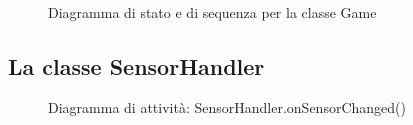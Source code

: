 \documentclass[a4paper,11pt]{article}
\begin{document}
\begin{figure}[!h]
\caption{Diagramma di stato e di sequenza per la classe Game\ \ \ }\ \\
\noindent{}
\end{figure}
\newpage

\subsection{La classe SensorHandler}

\begin{figure}[h]
\caption{Diagramma di attività: SensorHandler.onSensorChanged()}\noindent{}
\end{figure}
\end{document}
